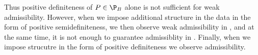 \begin{comment}
\begin{proof}
Fix an arbitrary $\alpha>0$. We show that there exists $P\in \P$ such that $\rho_\alpha(P)<0$.
For $\epsilon \in (0,1/2)$ let $P=(P^V,P^M)$ be the distribution such that $P^M$ is supported on $\{-I,I\}$ and takes on the value of $I$ with probability $1/2+\epsilon$. Then $A_P = 2\epsilon I \succ 0$, hence $P\in \P_1$. Further, $Q_P = I$.
Hence, $\rhos{P} = 4\epsilon-\alpha$. Hence, if $\epsilon<\alpha/4$, $\rho_\alpha(P)<0$.
\end{proof}
\end{comment}

\begin{comment}
\begin{proof}
Take any $P\in \P_{\text{PSD}}$ and let $H\sim P$.
Consider the SVD of $H$: $H = U \Lambda U^\top$ where $U$ is orthonormal and $\Lambda$ is diagonal with
nonnegative elements. Note that $\Lambda \preceq B\, \I$ and thus $\Lambda^2 \preceq B \Lambda$.
Then for any $x\in \R^d$, $x^\top H^\top H x = x^\top U \Lambda^2 U^\top x \le B x^\top U \Lambda U^\top x = B x^\top H x$.
Taking expectations we find that $x^\top Q_P x \le B x^\top H_P x$.
Hence, $\rho_\alpha(P) = 2 x^\top H_P x - \alpha x^\top Q_P x \ge (2- \alpha B ) \,x^\top H_P x $.
Thus, for any $\alpha<2/B$, $\rho_\alpha(P)>0$.
\end{proof}
\end{comment}
Thus  positive definiteness of $P\in \P_B$ alone is not sufficient for weak admissibility. However, when we impose additional structure in the data in the form of positive semidefiniteness,  we then observe weak admissibility in , and at the same time, it is not enough to guarantee admissiblity in . Finally, when we impose strucutre in the form of positive definiteness we observe admissibility.
\begin{comment}
\FloatBarrier
\begin{table}[H]
\begin{tabular}{|c|c|c|c|}\hline
Problem Class & Weak Admissible & Admissible &Example \\ \hline
$\P_B$ &\ding{53} &\ding{53} & RL\\\hline
$\P_{\text{PSD},B}$ &\ding{51} &\ding{53} & SGD for Linear Regression\\\hline
$\P_{\text{PD},B}$ &\ding{51} &\ding{51} & SGD for Linear Regression with regularization\\\hline
\end{tabular}
\end{table}
\end{comment}
